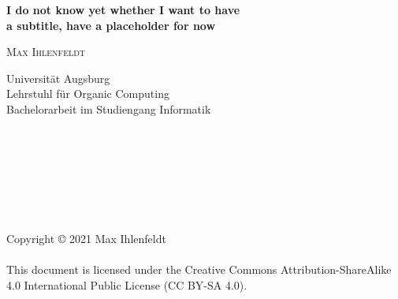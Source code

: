 \begin{verbatim}










\end{verbatim}

\begin{center}
	\huge{\textbf{\titleDocument}}
\end{center}

\begin{center}
	\Large{\textbf{I do not know yet whether I want to have\\a subtitle, have a placeholder for now}}
\end{center}

\vspace{.5em}
\begin{center}
	\large{\textsc{Max Ihlenfeldt}}
\end{center}

\begin{center}
	\large{
		Universität Augsburg \\
		Lehrstuhl für Organic Computing \\
		Bachelorarbeit im Studiengang Informatik
	}
\end{center}

\begin{verbatim}








\end{verbatim}

\begin{center}
	\large{
		Copyright \copyright{} 2021 Max Ihlenfeldt \\
		\phantom{} \\
		This document is licensed under the Creative Commons Attribution-ShareAlike 4.0 International Public License (CC BY-SA 4.0).
	}
\end{center}
